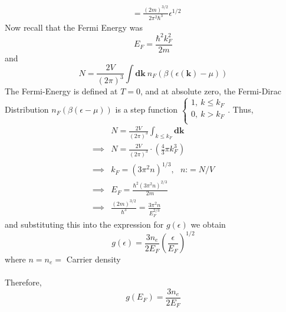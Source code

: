 \documentclass[11pt]{article}
\begin{document}
\begin{enumerate}
\begin{align*}
    &= \frac{(2m)^{3/2}}{2\pi^2 \hbar^3} \epsilon^{1/2}
  \end{align*} Now recall that the Fermi Energy was $$ E_F = \frac{\hbar^2 k_F^2}{2m}  $$ and $$ N = \frac{2V}{(2\pi)^3} \int \mathbf{dk}~n_F(\beta(\epsilon(\mathbf{k}) - \mu)) $$ The Fermi-Energy is defined at $T = 0$, and at absolute zero, the Fermi-Dirac Distribution $n_F(\beta(\epsilon - \mu))$ is a step function $\begin{cases}
    1,~k\leq k_F \\
    0,~k>k_F \\
  \end{cases}$. Thus,
  \begin{align*}
    & N = \frac{2V}{(2\pi)^3} \int_{k \leq k_F} \mathbf{dk} \\
    \implies& N = \frac{2V}{(2\pi)^3} \cdot \left(\frac{4}{3}\pi k_F^3\right) \\
    \implies& k_F = (3\pi^2 n)^{1/3},~~~n \text{:}= N/V \\
    \implies& E_F = \frac{\hbar^2 (3\pi^2 n)^{2/3} }{2m} \\
    \implies& \frac{(2m)^{3/2}}{\hbar^3} = \frac{3\pi^2 n}{E_F^{2/3}}
  \end{align*} and substituting this into the expression for $g(\epsilon)$ we obtain $$ \boxed{g(\epsilon) = \frac{3n_e}{2E_F} \left(\frac{\epsilon}{E_F}\right)^{1/2}}$$ where $n = n_e = $ Carrier density 
  \\
  \\
  Therefore, $$ \boxed{g(E_F) = \frac{3n_e}{2E_F} } $$



\end{enumerate}
\end{document}
